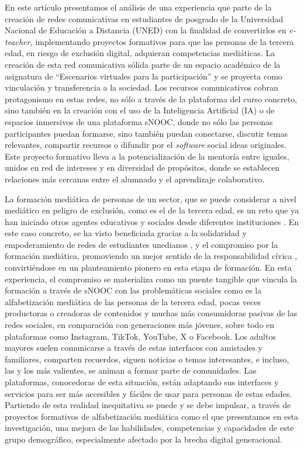 En este artículo presentamos el análisis de una experiencia que parte de
la creación de redes comunicativas en estudiantes de posgrado de la
Universidad Nacional de Educación a Distancia (UNED) con la finalidad de
convertirlos en \emph{e-teacher,} implementando proyectos formativos
para que las personas de la tercera edad, en riesgo de exclusión
digital, adquieran competencias mediáticas. La creación de esta red
comunicativa sólida parte de un espacio académico de la asignatura de
``Escenarios virtuales para la participación'' y se proyecta como
vinculación y transferencia a la sociedad. Los recursos comunicativos
cobran protagonismo en estas redes, no sólo a través de la plataforma
del curso concreto, sino también en la creación con el uso de la
Inteligencia Artificial (IA) o de espacios inmersivos de una plataforma
sNOOC, donde no sólo las personas participantes puedan formarse, sino
también puedan conectarse, discutir temas relevantes, compartir recursos
o difundir por el \emph{software} social ideas originales. Este proyecto
formativo lleva a la potencialización de la mentoría entre iguales,
unidos en red de intereses y en diversidad de propósitos, donde se
establecen relaciones más cercanas entre el alumnado y el aprendizaje
colaborativo.

La formación mediática de personas de un sector, que se puede considerar
a nivel mediático en peligro de exclusión, como es el de la tercera
edad, es un reto que ya han iniciado otros agentes educativos y sociales
desde diferentes instituciones \cite{abad-acala2014,abad-acala2017,Leal-Maridueña2017,heredia-sánchez2023}. En este caso
concreto, se ha visto beneficiada gracias a la solidaridad y
empoderamiento de redes de estudiantes unedianos \cite{Swan2015,Reich2015}, y el
compromiso por la formación mediática, promoviendo un mejor sentido de
la responsabilidad cívica \cite{bringle1996}, convirtiéndose en un
planteamiento pionero en esta etapa de formación. En esta experiencia,
el compromiso se materializa como un puente tangible que vincula la
formación a través de sNOOC con las problemáticas sociales como es la
alfabetización mediática de las personas de la tercera edad, pocas veces
productoras o creadoras de contenidos y muchas más consumidoras pasivas
de las redes sociales, en comparación con generaciones más jóvenes,
sobre todo en plataformas como Instagram, TikTok, YouTube, X o Facebook.
Los adultos mayores suelen comunicarse a través de estas interfaces con
amistades y familiares, comparten recuerdos, siguen noticias o temas
interesantes, e incluso, las y los más valientes, se animan a formar
parte de comunidades. Las plataformas, conocedoras de esta situación,
están adaptando sus interfaces y servicios para ser más accesibles y
fáciles de usar para personas de estas edades. Partiendo de esta
realidad inequitativa se puede y se debe impulsar, a través de proyectos
formativos de alfabetización mediática como el que presentamos en esta
investigación, una mejora de las habilidades, competencias y capacidades
de este grupo demográfico, especialmente afectado por la brecha digital
generacional.
